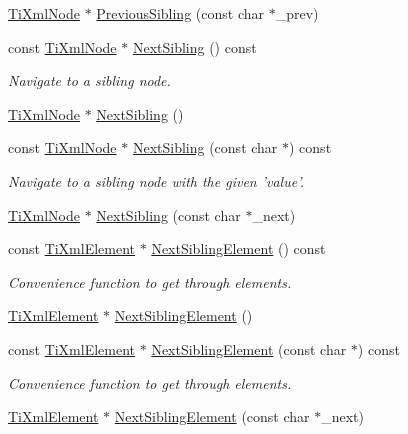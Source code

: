 \begin{DoxyCompactItemize}
\hyperlink{classTiXmlNode}{TiXmlNode} $\ast$ \hyperlink{classTiXmlNode_a6c977049207177ef21b51972315c2053}{PreviousSibling} (const char $\ast$\_\-prev)
\item 
const \hyperlink{classTiXmlNode}{TiXmlNode} $\ast$ \hyperlink{classTiXmlNode_af854baeba384f5fe9859f5aee03b548e}{NextSibling} () const 
\begin{DoxyCompactList}\small\item\em Navigate to a sibling node. \item\end{DoxyCompactList}\item 
\hyperlink{classTiXmlNode}{TiXmlNode} $\ast$ \hyperlink{classTiXmlNode_a4d05f7b1d7b470ac6887edd072d4892a}{NextSibling} ()
\item 
const \hyperlink{classTiXmlNode}{TiXmlNode} $\ast$ \hyperlink{classTiXmlNode_acaf9dc17531ac041f602f9ad579573ea}{NextSibling} (const char $\ast$) const 
\begin{DoxyCompactList}\small\item\em Navigate to a sibling node with the given 'value'. \item\end{DoxyCompactList}\item 
\hyperlink{classTiXmlNode}{TiXmlNode} $\ast$ \hyperlink{classTiXmlNode_a4080bc5cc8a5c139e7cf308669e850fc}{NextSibling} (const char $\ast$\_\-next)
\item 
const \hyperlink{classTiXmlElement}{TiXmlElement} $\ast$ \hyperlink{classTiXmlNode_a7667217e269e0da01d1f82aee94d1a3d}{NextSiblingElement} () const 
\begin{DoxyCompactList}\small\item\em Convenience function to get through elements. \item\end{DoxyCompactList}\item 
\hyperlink{classTiXmlElement}{TiXmlElement} $\ast$ \hyperlink{classTiXmlNode_a1b211cb5034655a04358e0e2f6fc5010}{NextSiblingElement} ()
\item 
const \hyperlink{classTiXmlElement}{TiXmlElement} $\ast$ \hyperlink{classTiXmlNode_a3d7897999f99cf4870dd59df6331d7ff}{NextSiblingElement} (const char $\ast$) const 
\begin{DoxyCompactList}\small\item\em Convenience function to get through elements. \item\end{DoxyCompactList}\item 
\hyperlink{classTiXmlElement}{TiXmlElement} $\ast$ \hyperlink{classTiXmlNode_a6e1ac6b800e18049bc75e9f8e63a8e5f}{NextSiblingElement} (const char $\ast$\_\-next)

\end{DoxyCompactItemize}
